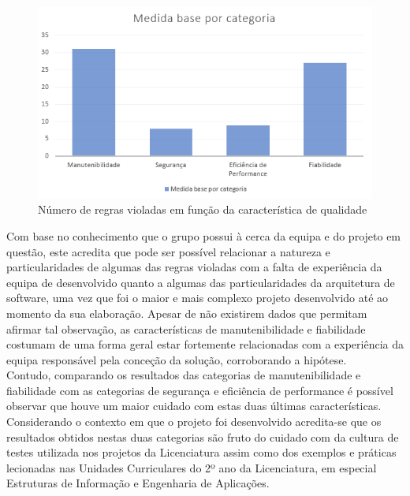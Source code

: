 \documentclass[openany,10pt,a4paper]{article}
\begin{document}
\begin{figure}[H]
	\centering
	\includegraphics[width=0.7\linewidth]{graph_results_product.PNG}
	\caption{Número de regras violadas em função da característica de qualidade \small}
	\label{fig_quality}
\end{figure}
Com base no conhecimento que o grupo possui à cerca da equipa e do projeto em questão, este acredita que pode ser possível relacionar a natureza e particularidades de algumas das regras violadas com a falta de experiência da equipa de desenvolvido quanto a algumas das particularidades da arquitetura de software, uma vez que foi o maior e mais complexo projeto desenvolvido até ao momento da sua elaboração. Apesar de não existirem dados que permitam afirmar tal observação, as características de manutenibilidade e fiabilidade costumam de uma forma geral estar fortemente relacionadas com a experiência da equipa responsável pela conceção da solução, corroborando a hipótese. \\
Contudo, comparando os resultados das categorias de manutenibilidade e fiabilidade com as categorias de segurança e eficiência de performance é possível observar que houve um maior cuidado com estas duas últimas características. Considerando o contexto em que o projeto foi desenvolvido acredita-se que os resultados obtidos nestas duas categorias são fruto do cuidado com da cultura de testes utilizada nos projetos da Licenciatura assim como dos exemplos e práticas lecionadas nas Unidades Curriculares do 2º ano da Licenciatura, em especial Estruturas de Informação e Engenharia de Aplicações.
\end{document}
